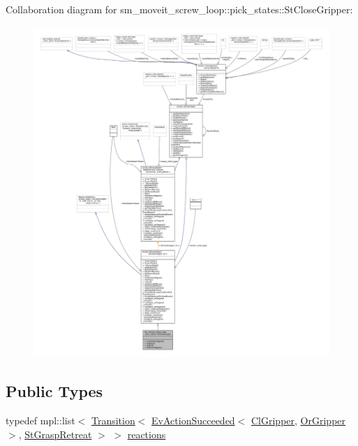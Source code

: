 Collaboration diagram for sm\+\_\+moveit\+\_\+screw\+\_\+loop\+:\+:pick\+\_\+states\+:\+:St\+Close\+Gripper\+:
\nopagebreak
\begin{figure}[H]
\begin{center}
\leavevmode
\includegraphics[width=350pt]{structsm__moveit__screw__loop_1_1pick__states_1_1StCloseGripper__coll__graph}
\end{center}
\end{figure}
\subsection*{Public Types}
\begin{DoxyCompactItemize}
\item 
typedef mpl\+::list$<$ \hyperlink{classsmacc_1_1Transition}{Transition}$<$ \hyperlink{structsmacc_1_1default__events_1_1EvActionSucceeded}{Ev\+Action\+Succeeded}$<$ \hyperlink{classsm__moveit__screw__loop_1_1cl__gripper_1_1ClGripper}{Cl\+Gripper}, \hyperlink{classsm__moveit__screw__loop_1_1OrGripper}{Or\+Gripper} $>$, \hyperlink{structsm__moveit__screw__loop_1_1pick__states_1_1StGraspRetreat}{St\+Grasp\+Retreat} $>$ $>$ \hyperlink{structsm__moveit__screw__loop_1_1pick__states_1_1StCloseGripper_a9ed485a3ebec02d1997b55bdc968e9c8}{reactions}
\end{DoxyCompactItemize}
